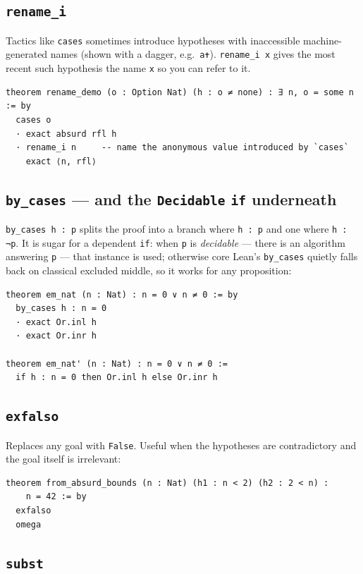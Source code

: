 \documentclass[12pt, a4paper, openright]{book}
\theoremstyle{thmstyle}
\theoremstyle{defstyle}
\newcommand{\lc}[1]{\texttt{#1}}
\begin{document}
\subsection*{\lc{rename\_i}}

Tactics like \lc{cases} sometimes introduce hypotheses with inaccessible
machine-generated names (shown with a dagger, e.g.\ \lc{a✝}).
\lc{rename\_i x} gives the most recent such hypothesis the name \lc{x} so
you can refer to it.

\begin{verbatim}
theorem rename_demo (o : Option Nat) (h : o ≠ none) : ∃ n, o = some n := by
  cases o
  · exact absurd rfl h
  · rename_i n     -- name the anonymous value introduced by `cases`
    exact ⟨n, rfl⟩
\end{verbatim}

\subsection*{\lc{by\_cases} --- and the \lc{Decidable} \lc{if} underneath}

\lc{by\_cases h : p} splits the proof into a branch where \lc{h : p} and
one where \lc{h : ¬p}. It is sugar for a dependent \lc{if}: when \lc{p} is
\emph{decidable} --- there is an algorithm answering \lc{p} --- that
instance is used; otherwise core Lean's \lc{by\_cases} quietly falls back
on classical excluded middle, so it works for any proposition:

\begin{verbatim}
theorem em_nat (n : Nat) : n = 0 ∨ n ≠ 0 := by
  by_cases h : n = 0
  · exact Or.inl h
  · exact Or.inr h

theorem em_nat' (n : Nat) : n = 0 ∨ n ≠ 0 :=
  if h : n = 0 then Or.inl h else Or.inr h
\end{verbatim}

\subsection*{\lc{exfalso}}

Replaces any goal with \lc{False}. Useful when the hypotheses are
contradictory and the goal itself is irrelevant:

\begin{verbatim}
theorem from_absurd_bounds (n : Nat) (h1 : n < 2) (h2 : 2 < n) :
    n = 42 := by
  exfalso
  omega
\end{verbatim}

\subsection*{\lc{subst}}
\end{document}
